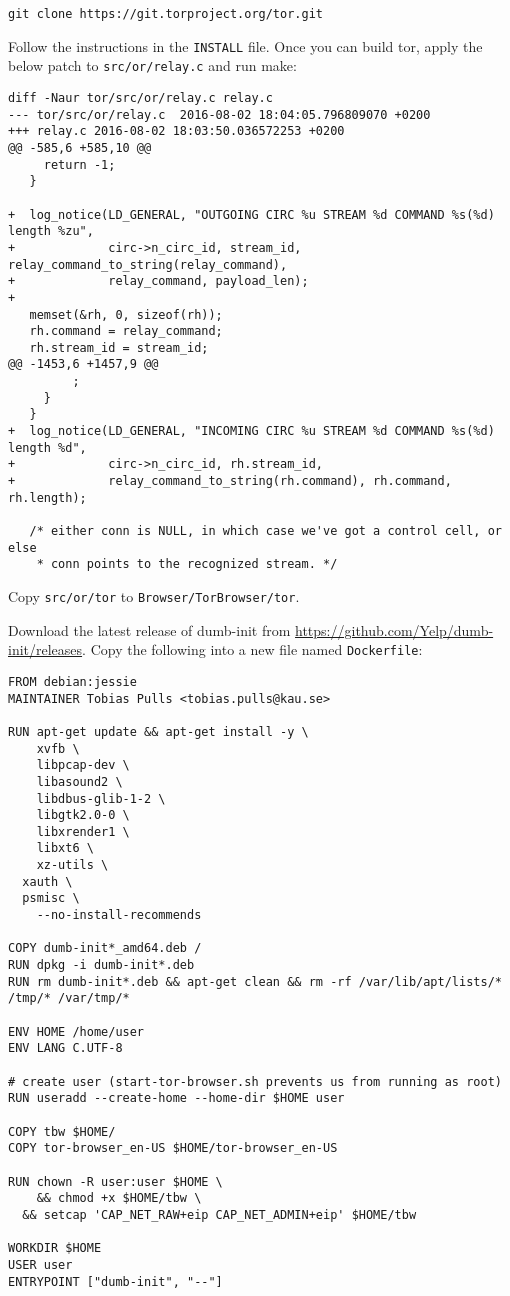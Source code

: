\documentclass{article}
\begin{document}
\begin{lstlisting}
git clone https://git.torproject.org/tor.git
\end{lstlisting}
Follow the instructions in the {\tt INSTALL} file. Once you can build tor,
apply the below patch to {\tt src/or/relay.c} and run make:
\begin{lstlisting}
diff -Naur tor/src/or/relay.c relay.c
--- tor/src/or/relay.c	2016-08-02 18:04:05.796809070 +0200
+++ relay.c	2016-08-02 18:03:50.036572253 +0200
@@ -585,6 +585,10 @@
     return -1;
   }

+  log_notice(LD_GENERAL, "OUTGOING CIRC %u STREAM %d COMMAND %s(%d) length %zu",
+             circ->n_circ_id, stream_id, relay_command_to_string(relay_command),
+             relay_command, payload_len);
+
   memset(&rh, 0, sizeof(rh));
   rh.command = relay_command;
   rh.stream_id = stream_id;
@@ -1453,6 +1457,9 @@
         ;
     }
   }
+  log_notice(LD_GENERAL, "INCOMING CIRC %u STREAM %d COMMAND %s(%d) length %d",
+             circ->n_circ_id, rh.stream_id,
+             relay_command_to_string(rh.command), rh.command, rh.length);

   /* either conn is NULL, in which case we've got a control cell, or else
    * conn points to the recognized stream. */
\end{lstlisting}
Copy {\tt src/or/tor} to {\tt Browser/TorBrowser/tor}.

Download the latest release of dumb-init from
\url{https://github.com/Yelp/dumb-init/releases}.
Copy the following into a
new file named \texttt{Dockerfile}:

\begin{lstlisting}
FROM debian:jessie
MAINTAINER Tobias Pulls <tobias.pulls@kau.se>

RUN apt-get update && apt-get install -y \
	xvfb \
	libpcap-dev \
	libasound2 \
	libdbus-glib-1-2 \
	libgtk2.0-0 \
	libxrender1 \
	libxt6 \
	xz-utils \
  xauth \
  psmisc \
	--no-install-recommends

COPY dumb-init*_amd64.deb /
RUN dpkg -i dumb-init*.deb
RUN rm dumb-init*.deb && apt-get clean && rm -rf /var/lib/apt/lists/* /tmp/* /var/tmp/*

ENV HOME /home/user
ENV LANG C.UTF-8

# create user (start-tor-browser.sh prevents us from running as root)
RUN useradd --create-home --home-dir $HOME user

COPY tbw $HOME/
COPY tor-browser_en-US $HOME/tor-browser_en-US

RUN chown -R user:user $HOME \
	&& chmod +x $HOME/tbw \
  && setcap 'CAP_NET_RAW+eip CAP_NET_ADMIN+eip' $HOME/tbw

WORKDIR $HOME
USER user
ENTRYPOINT ["dumb-init", "--"]
\end{lstlisting}
\end{document}
